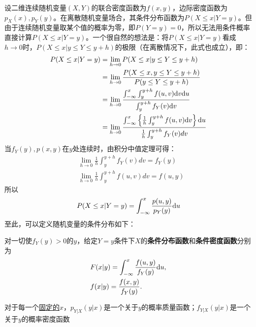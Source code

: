 设二维连续随机变量$(X,Y)$的联合密度函数为$f(x,y)$，边际密度函数为$p_X(x),p_Y(y)$。在离散随机变量场合，其条件分布函数为$P(X \le x|Y=y)$。但由于连续随机变量取某个值的概率为零，即$P(Y=y)=0$，所以无法用条件概率直接计算$P(X \le x|Y=y)$。一个很自然的想法是：将$P(X \le x|Y=y)$看成$h \to 0$时，$P(X \le x|y \le Y \le y+h)$的极限（在离散情况下，此式也成立），即：
\begin{align*}
    P(X \le x|Y=y) & = \lim_{h \to 0} P(X \le x|y \le Y \le y+h)                                                                                           \\
                   & = \lim_{h \to 0} \frac{P(X \le x, y \le Y \le y+h)}{P(y \le Y \le y+h)}                                                               \\
                   & =\lim_{h \to 0} \frac{\int_{-\infty}^{x} \int_y^{y+h} f(u,v) \mathrm{d} v \mathrm{d} u}{\int_y^{y+h} f_Y(v) \mathrm{d} v}                                     \\
                   & =\lim_{h \to 0} \frac{\int_{-\infty}^{x} \left\{ \frac1{h} \int_y^{y+h} f(u, v) \mathrm{d} v \right\} \mathrm{d} u}{\frac1{h} \int_y^{y+h} f_Y(v) dv}
\end{align*}
当$f_Y(y),p(x,y)$在$y$处连续时，由积分中值定理可得：
\begin{align*}
     & \lim_{h \to 0} \frac1{h} \int_y^{y+h} f_Y(v) dv=f_Y(y)    \\
     & \lim_{h \to 0} \frac{1}{h} \int_y^{y+h} f(u, v) dv=f(u,y)
\end{align*}
所以
\[ P(X \le x |Y=y)=\int_{-\infty}^{x} \frac{p(u, y)}{p_Y(y)} \mathrm{d} u \]
至此，可以定义随机变量的条件分布如下：
\begin{definition}[条件分布]\label{def:cond_dist}
    对一切使$f_Y(y)>0$的$y$，给定$Y=y$条件下$X$的\textbf{条件分布函数}和\textbf{条件密度函数}分别为
    \begin{align*}
         & F(x | y)=\int_{-\infty}^{x} \frac{f(u, y)}{f_Y(y)} \mathrm{d} u, \\
         & f(x | y)=\frac{f(x, y)}{f_Y(y)}.
    \end{align*}
\end{definition}

\begin{remark}
    对于每一个\underline{固定的$x$}，$p_{Y|X}(y|x)$是一个关于$y$的概率质量函数；$f_{Y|X}(y|x)$是一个关于$y$的概率密度函数
\end{remark}

